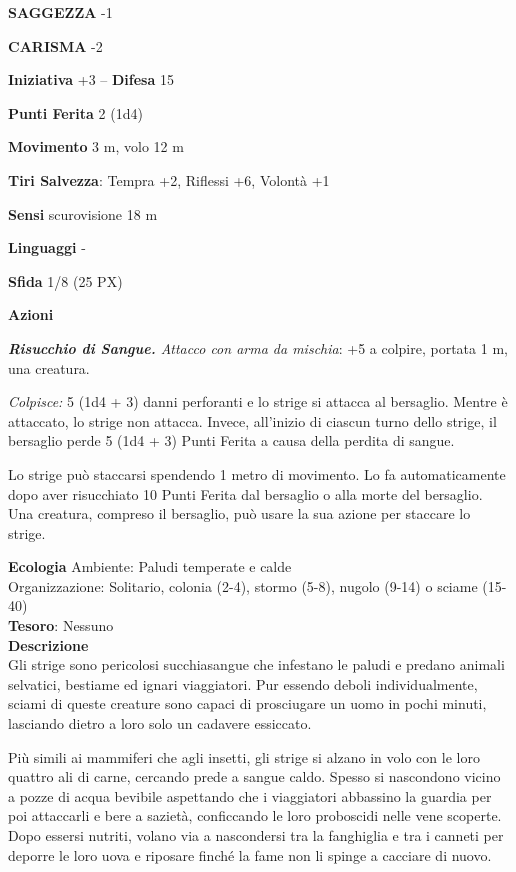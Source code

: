 \begin{multicols}{2}
	\textbf{SAGGEZZA} -1

	\textbf{CARISMA} -2

	\textbf{Iniziativa} +3 -- \textbf{Difesa} 15

	\textbf{Punti Ferita} 2 (1d4)

	\textbf{Movimento} 3 m, volo 12 m

	\textbf{Tiri Salvezza}: Tempra +2, Riflessi +6, Volontà +1

	\textbf{Sensi} scurovisione 18 m

	\textbf{Linguaggi} -

	\textbf{Sfida} 1/8 (25 PX)

	\textbf{Azioni}

	\textit{\textbf{Risucchio di Sangue.} Attacco con arma da mischia}: +5 a colpire, portata 1 m, una creatura.

	\textit{Colpisce:} 5 (1d4 + 3) danni perforanti e lo strige si attacca al bersaglio. Mentre è attaccato, lo strige non attacca. Invece, all'inizio di ciascun turno dello strige, il bersaglio perde 5 (1d4 + 3) Punti Ferita a causa della perdita di sangue.

	Lo strige può staccarsi spendendo 1 metro di movimento. Lo fa automaticamente dopo aver risucchiato 10 Punti Ferita dal bersaglio o alla morte del bersaglio. Una creatura, compreso il bersaglio, può usare la sua azione per staccare lo strige.

	\textbf{Ecologia}
	Ambiente: Paludi temperate e calde\\
	Organizzazione: Solitario, colonia (2-4), stormo (5-8), nugolo (9-14) o sciame (15-40)\\
	\textbf{Tesoro}: Nessuno\\
	\textbf{Descrizione}\\
	Gli strige sono pericolosi succhiasangue che infestano le paludi e predano animali selvatici, bestiame ed ignari viaggiatori. Pur essendo deboli individualmente, sciami di queste creature sono capaci di prosciugare un uomo in pochi minuti, lasciando dietro a loro solo un cadavere essiccato.

	Più simili ai mammiferi che agli insetti, gli strige si alzano in volo con le loro quattro ali di carne, cercando prede a sangue caldo. Spesso si nascondono vicino a pozze di acqua bevibile aspettando che i viaggiatori abbassino la guardia per poi attaccarli e bere a sazietà, conficcando le loro proboscidi nelle vene scoperte. Dopo essersi nutriti, volano via a nascondersi tra la fanghiglia e tra i canneti per deporre le loro uova e riposare finché la fame non li spinge a cacciare di nuovo.


\end{multicols}
